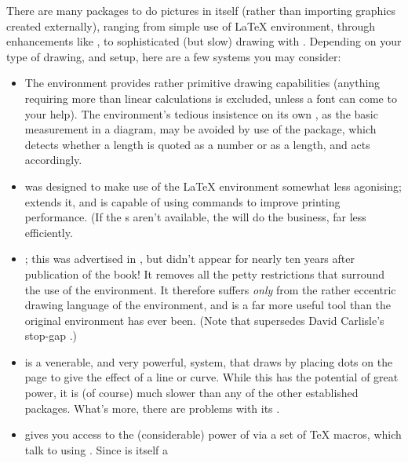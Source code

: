 
There are many packages to do pictures in \AllTeX{} itself (rather than
importing graphics created externally), ranging from simple use of
\LaTeX{}  environment, through enhancements like
, to 
sophisticated (but slow) drawing with \pictex{}. Depending on your type
of drawing, and setup, here are a few systems you may consider:
\begin{itemize}
\item The  environment provides rather primitive
  drawing capabilities (anything requiring more than linear
  calculations is excluded, unless a font can come to your help).  The
  environment's tedious insistence on its own , as the
  basic measurement in a diagram, may be avoided by use of the
   package, which detects whether a length is quoted
  as a number or as a length, and acts accordingly.
\item {} was designed to make use of the \LaTeX{}
   environment somewhat less agonising;
   extends it, and is capable of using 
   commands to improve printing performance.  (If the
  s aren't available, the  will do the
  business, far less efficiently.
\item {}; this was advertised in %
  , but didn't appear for nearly
  ten years after publication of the book!  It removes all the petty
  restrictions that surround the use of the 
  environment.  It therefore suffers \emph{only} from the rather
  eccentric drawing language of the environment, and is a far more
  useful tool than the original environment has ever been.  (Note that
   supersedes David Carlisle's stop-gap
  .)
\item \pictex{} is a venerable, and very powerful, system, that draws
  by placing dots on the page to give the effect of a line or curve.  While
  this has the potential of great power, it is (of course) much slower
  than any of the other established packages.  What's more, there
  are problems with its .
\item {} gives you access to the (considerable) power of
  \PS{} via a set of \TeX{} macros, which talk to \PS{} using 
  .  Since \PS{} is itself a

\end{itemize}
